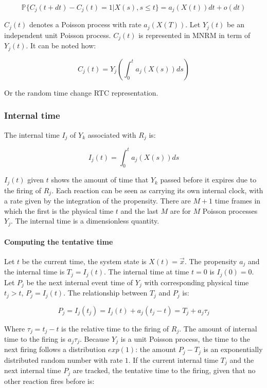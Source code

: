    $$\mathbb{P}\{C_j(t+dt)-C_j(t) = 1|X(s),s\le t\} = a_j(X(t))dt + o(dt)$$

    $C_j(t)$ denotes a Poisson process with rate $a_j(X(T))$.
    Let $Y_j(t)$ be an independent unit Poisson process.
    $C_j(t)$ is represented in MNRM in term of $Y_j(t)$.
    It can be noted how:

    $$C_j(t) = Y_j\left(\int_0^t a_j(X(s))ds\right)$$

    Or the random time change RTC representation.

    \subsubsection{Internal time}
    The internal time $I_j$ of $Y_k$ associated with $R_j$ is:

    $$I_j(t) = \int_0^ta_j(X(s))ds$$

    $I_j(t)$ given $t$ shows the amount of time that $Y_k$ passed before it expires due to the firing of $R_j$.
    Each reaction can be seen as carrying its own internal clock, with a rate given by the integration of the propensity.
    There are $M+1$ time frames in which the first is the physical time $t$ and the last $M$ are for $M$ Poisson processes $Y_j$.
    The internal time is a dimensionless quantity.

      \paragraph{Computing the tentative time}
      Let $t$ be the current time, the system state is $X(t) = \vec{x}$.
      The propensity $a_j$ and the internal time is $T_j = I_j(t)$.
      The internal time at time $t=0$ is $I_j(0) = 0$.
      Let $P_j$ be the next internal event time of $Y_j$ with corresponding physical time $t_j>t$, $P_j = I_j(t)$.
      The relationship between $T_j$ and $P_j$ is:

      $$P_j = I_j(t_j) = I_j(t) + a_j(t_j-t) = T_j+a_j\tau_j$$

      Where $\tau_j = t_j-t$ is the relative time to the firing of $R_j$.
      The amount of internal time to the firing is $a_j\tau_j$.
      Because $Y_j$ is a unit Poisson process, the time to the next firing follows a distribution $exp(1)$: the amount $P_j-T_j$ is an exponentially distributed random number with rate $1$.
      If the current internal time $T_j$ and the next internal time $P_j$ are tracked, the tentative time to the firing, given that no other reaction fires before is:

